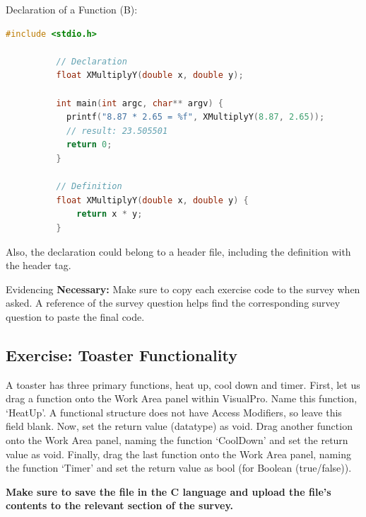 \documentclass[10pt]{article}
\begin{document}
      \begin{example}{Declaration of a Function (B):}
        \begin{lstlisting}[language=c]
          #include <stdio.h>

          // Declaration
          float XMultiplyY(double x, double y);

          int main(int argc, char** argv) {
            printf("8.87 * 2.65 = %f", XMultiplyY(8.87, 2.65)); 
            // result: 23.505501
            return 0;
          }

          // Definition
          float XMultiplyY(double x, double y) {
              return x * y;
          }
        \end{lstlisting}

        Also, the declaration could belong to a header file, including the definition with the header tag.
      \end{example}

      \begin{tip}{Evidencing}
        \textbf{Necessary:} Make sure to copy each exercise code to the survey when asked. A reference of the survey question helps find the corresponding survey question to paste the final code.
      \end{tip}

    \subsection{Exercise: Toaster Functionality}
      A toaster has three primary functions, heat up, cool down and timer. First, let us drag a function onto the Work Area panel within VisualPro. Name this function, `HeatUp'. A functional structure does not have Access Modifiers, so leave this field blank. Now, set the return value (datatype) as void. Drag another function onto the Work Area panel, naming the function `CoolDown' and set the return value as void. Finally, drag the last function onto the Work Area panel, naming the function `Timer' and set the return value as bool (for Boolean (true/false)).

      \textbf{Make sure to save the file in the C language and upload the file's contents to the relevant section of the survey.} 
\end{document}
